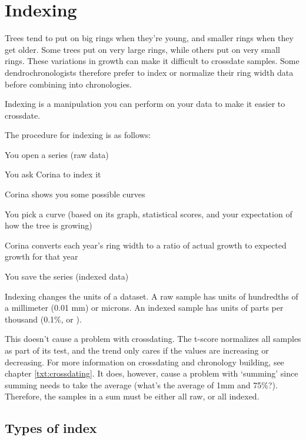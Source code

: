\chapter{Indexing}

Trees tend to put on big rings when they're young, and smaller rings when they get older. Some trees put on very large rings, while others put on very small rings. These variations in growth can make it difficult to crossdate samples.  Some dendrochronologists therefore prefer to index or normalize their ring width data before combining into chronologies.

Indexing is a manipulation you can perform on your data to make it easier to crossdate.

The procedure for indexing is as follows:

\begin{enumerate*}
   \item You open a series (raw data)
   \item You ask Corina to index it
   \item Corina shows you some possible curves
   \item You pick a curve (based on its graph, statistical scores, and your expectation of how the tree is growing)
   \item Corina converts each year's ring width to a ratio of actual growth to expected growth for that year
   \item You save the series (indexed data) 
\end{enumerate*}

Indexing changes the units of a dataset. A raw sample has units of hundredths of a millimeter (0.01 mm) or microns. An indexed sample has units of parts per thousand (0.1\%, or \textperthousand).

This doesn't cause a problem with crossdating. The t-score normalizes all samples as part of its test, and the trend only cares if the values are increasing or decreasing. For more information on crossdating and chronology building, see chapter \ref{txt:crossdating}.  It does, however, cause a problem with `summing' since summing needs to take the average (what's the average of 1mm and 75\%?). Therefore, the samples in a sum must be either all raw, or all indexed. 

\section{Types of index}

